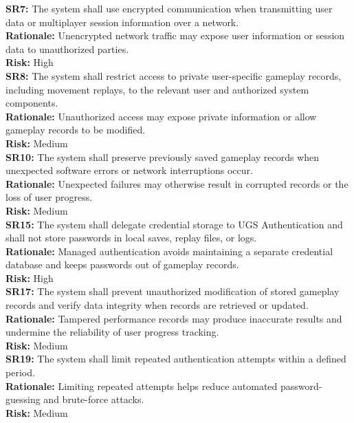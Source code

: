\documentclass{article}
\newcommand{\reqdef}[1]{\textbf{#1:}}
\begin{document}
\noindent
\reqdef{SR7} The system shall use encrypted communication when transmitting user data or multiplayer session information over a network.\\
\textbf{Rationale:} Unencrypted network traffic may expose user information or session data to unauthorized parties.\\
\textbf{Risk:} High\\[1em]

\noindent
\reqdef{SR8} The system shall restrict access to private user-specific gameplay records, including movement replays, to the relevant user and authorized system components.\\
\textbf{Rationale:} Unauthorized access may expose private information or allow gameplay records to be modified.\\
\textbf{Risk:} Medium\\[1em]

\noindent
\reqdef{SR10} The system shall preserve previously saved gameplay records when unexpected software errors or network interruptions occur.\\
\textbf{Rationale:} Unexpected failures may otherwise result in corrupted records or the loss of user progress.\\
\textbf{Risk:} Medium\\[1em]

\noindent
\reqdef{SR15} The system shall delegate credential storage to UGS Authentication and shall not store passwords in local saves, replay files, or logs.\\
\textbf{Rationale:} Managed authentication avoids maintaining a separate credential database and keeps passwords out of gameplay records.\\
\textbf{Risk:} High\\[1em]

\noindent
\reqdef{SR17} The system shall prevent unauthorized modification of stored gameplay records and verify data integrity when records are retrieved or updated.\\
\textbf{Rationale:} Tampered performance records may produce inaccurate results and undermine the reliability of user progress tracking.\\
\textbf{Risk:} Medium\\[1em]

\noindent
\reqdef{SR19} The system shall limit repeated authentication attempts within a defined period.\\
\textbf{Rationale:} Limiting repeated attempts helps reduce automated password-guessing and brute-force attacks.\\
\textbf{Risk:} Medium\\[1em]
\end{document}
